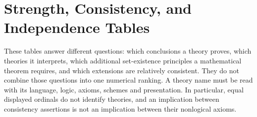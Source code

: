\chapter{Strength, Consistency, and Independence Tables}
\label{sec:p14-strength-consistency-and-independence}

These tables answer different questions: which conclusions a theory proves,
which theories it interprets, which additional set-existence principles a
mathematical theorem requires, and which extensions are relatively consistent.
They do not combine those questions into one numerical ranking. A theory
name must be read with its language, logic, axioms, schemes and presentation.
In particular, equal displayed ordinals do not identify theories, and an
implication between consistency assertions is not an implication between
their nonlogical axioms.

